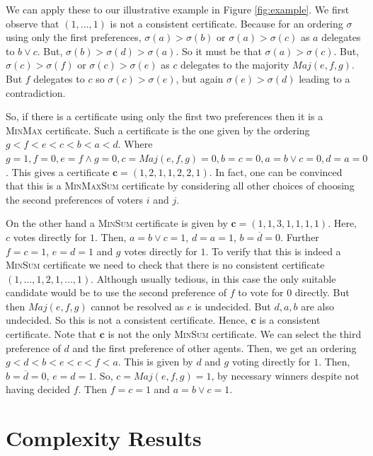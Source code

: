 \documentclass[11pt,a4paper, titlepage]{article}
\theoremstyle{definition}
\let\vec\mathbf
\newcommand{\Maj}{\mathit{Maj}}
\begin{document}
We can apply these to our illustrative example in Figure \ref{fig:example}. We first observe that $(1, \ldots, 1)$ is not a consistent certificate. Because for an ordering $\sigma$ using only the first preferences, $\sigma(a) > \sigma(b)$ or $\sigma(a) > \sigma(c)$ as $a$ delegates to $b \lor c$. But, $\sigma(b) > \sigma(d) > \sigma(a)$. So it must be that $\sigma(a) > \sigma(c)$. But, $\sigma(c) > \sigma(f)$ or $\sigma(c) > \sigma(e)$ as $c$ delegates to the majority $\Maj(e, f, g)$. 
But $f$ delegates to $c$ so $\sigma(c) > \sigma(e)$, but again $\sigma(e) > \sigma(d)$ leading to a contradiction.

So, if there is a certificate using only the first two preferences then it is a \textsc{MinMax} certificate. 
Such a certificate is the one given by the ordering $g< f< e< c< b< a< d$.
Where $g = 1, f = 0, e = f \land g = 0, c = Maj(e, f, g) = 0, b = c = 0, a = b \lor c = 0, d = a = 0$. This gives a certificate $\vec{c} = (1, 2, 1, 1, 2, 2, 1)$.
In fact, one can be convinced that this is a \textsc{MinMaxSum} certificate by considering all other choices of choosing the second preferences of voters $i$ and $j$.

On the other hand a \textsc{MinSum} certificate is given by $\vec{c} = (1, 1, 3, 1, 1, 1, 1)$.
Here, $c$ votes directly for $1$. Then, $a = b \lor c = 1$, $d = a = 1$, $b = \overline{d} = 0$. Further $f = c = 1$, $e = d = 1$ and $g$ votes directly for $1$.
To verify that this is indeed a \textsc{MinSum} certificate we need to check that there is no consistent certificate $(1, \ldots, 1, 2, 1, \ldots, 1)$.
Although usually tedious, in this case the only suitable candidate would be to use the second preference of $f$ to vote for $0$ directly. But then $\Maj(e, f, g)$ cannot be resolved as $e$ is undecided. But $d, a, b$ are also undecided. So this is not a consistent certificate.
Hence, $\vec{c}$ is a consistent certificate.
Note that $\vec{c}$ is not the only \textsc{MinSum} certificate. We can select the third preference of $d$ and the first preference of other agents.
Then, we get an ordering $g < d < b < e < c < f < a$.
This is given by $d$ and $g$ voting directly for $1$.
Then, $b = \overline{d} = 0$, $e = d = 1$. So, $c = \Maj(e, f, g) = 1$, by necessary winners despite not having decided $f$. Then $f = c = 1$ and $a = b \lor c = 1$.

\newpage



\section{Complexity Results}
\label{section:Complexity}
\end{document}
